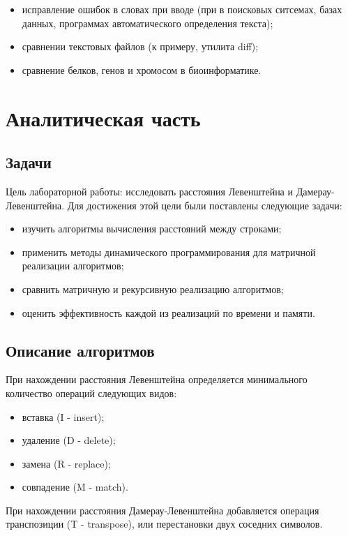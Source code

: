 ﻿\documentclass[12pt]{report}
\begin{document}
	\begin{itemize}
		\item исправление ошибок в словах при вводе (при в поисковых ситсемах, базах данных, программах автоматического определения текста);
		\item сравнении текстовых файлов (к примеру, утилита diff);
		\item сравнение белков, генов и хромосом в биоинформатике.
	\end{itemize}

    \chapter{Аналитическая часть}

	 \section{Задачи}
	Цель лабораторной работы: исследовать расстояния Левенштейна и Дамерау-Левенштейна. Для достижения этой цели были поставлены следующие задачи: 
	\begin{itemize}
		\item изучить алгоритмы вычисления расстояний между строками;
		\item применить методы динамического программирования для матричной реализации алгоритмов;
		\item сравнить матричную и рекурсивную реализацию алгоритмов;
		\item оценить эффективность каждой из реализаций по времени и памяти.
	\end{itemize}

	 \section{Описание алгоритмов}
    При нахождении расстояния Левенштейна определяется минимального количество операций следующих видов:
	\begin{itemize}
		\item вставка (I - insert);
		\item удаление (D - delete);
		\item замена (R - replace);
		\item совпадение (M - match).	
	\end{itemize}
	При нахождении расстояния Дамерау-Левенштейна добавляется операция транспозиции (T - transpose), или перестановки двух соседних символов.\\
\end{document}
